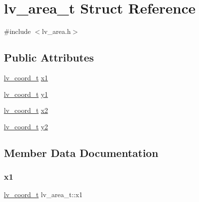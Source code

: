 \hypertarget{structlv__area__t}{}\section{lv\+\_\+area\+\_\+t Struct Reference}
\label{structlv__area__t}


{\ttfamily \#include $<$lv\+\_\+area.\+h$>$}

\subsection*{Public Attributes}
\begin{DoxyCompactItemize}
\item 
\mbox{\hyperlink{lv__area_8h_ad98932f5017f20988532bb68b32a6d76}{lv\+\_\+coord\+\_\+t}} \mbox{\hyperlink{structlv__area__t_a56d2e4d92428979499ff6a06e3d23cba}{x1}}
\item 
\mbox{\hyperlink{lv__area_8h_ad98932f5017f20988532bb68b32a6d76}{lv\+\_\+coord\+\_\+t}} \mbox{\hyperlink{structlv__area__t_a8e6b43ed9ab280f66ae4e00af312ca27}{y1}}
\item 
\mbox{\hyperlink{lv__area_8h_ad98932f5017f20988532bb68b32a6d76}{lv\+\_\+coord\+\_\+t}} \mbox{\hyperlink{structlv__area__t_aec0405ee6e0fa96f922fee6851240081}{x2}}
\item 
\mbox{\hyperlink{lv__area_8h_ad98932f5017f20988532bb68b32a6d76}{lv\+\_\+coord\+\_\+t}} \mbox{\hyperlink{structlv__area__t_ac3da01ffe2d07a8e446684160dd1f7fc}{y2}}
\end{DoxyCompactItemize}


\subsection{Member Data Documentation}
\mbox{\label{structlv__area__t_a56d2e4d92428979499ff6a06e3d23cba}} 
\subsubsection{\texorpdfstring{x1}{x1}}
{\footnotesize\ttfamily \mbox{\hyperlink{lv__area_8h_ad98932f5017f20988532bb68b32a6d76}{lv\+\_\+coord\+\_\+t}} lv\+\_\+area\+\_\+t\+::x1}

\mbox{\label{structlv__area__t_aec0405ee6e0fa96f922fee6851240081}} 
